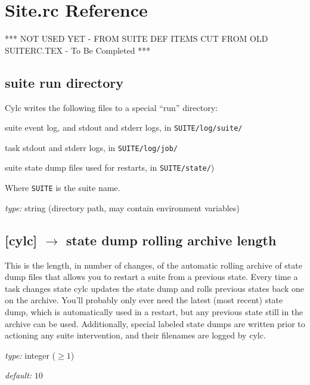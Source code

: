 \section{Site.rc Reference}
\label{SiteRCReference}

\lstset{language=bash}

*** NOT USED YET - FROM SUITE DEF ITEMS CUT FROM OLD SUITERC.TEX - To Be Completed ***

\subsection[run directory]{suite run directory}

Cylc writes the following files to a special ``run'' directory:

\begin{myitemize}
    \item suite event log, and stdout and stderr logs, in \lstinline=SUITE/log/suite/=
    \item task stdout and stderr logs, in \lstinline=SUITE/log/job/= 
    \item suite state dump files used for restarts, in \lstinline=SUITE/state/=)
\end{myitemize}
Where \lstinline=SUITE= is the suite name.

\begin{myitemize}
    \item {\em type:} string (directory path, may contain environment variables)
\end{myitemize}

\subsection[state dump rolling archive length]{[cylc] $\rightarrow$ state dump rolling archive length}

This is the length, in number of changes, of the automatic rolling
archive of state dump files that allows you to restart a suite from a
previous state.  Every time a task changes state cylc updates the state
dump and rolls previous states back one on the archive. You'll probably
only ever need the latest (most recent) state dump, which is
automatically used in a restart, but any previous state still in the
archive can be used.  Additionally, special labeled state dumps are
written prior to actioning any suite intervention, and their filenames
are logged by cylc.

\begin{myitemize}
    \item {\em type:} integer ($\geq 1$)
    \item {\em default:} $10$
\end{myitemize}


